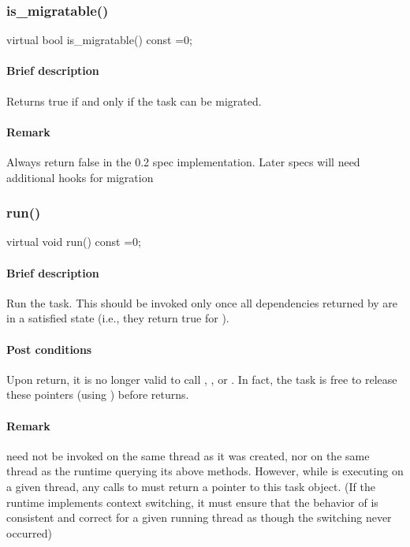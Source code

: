 \subsubsection{is\_migratable()}
\begin{CppCode}
    virtual bool
    is_migratable() const =0;
\end{CppCode}

\paragraph{Brief description} Returns true if and only if the task can be migrated.
     
\paragraph{Remark} Always return false in the 0.2 spec implementation.  Later specs will need
       additional hooks for migration



\subsubsection{run()}
\begin{CppCode}
    virtual void
    run() const =0;
\end{CppCode}

\paragraph{Brief description} Run the task.
       This should be invoked only once all dependencies returned by 
       are in a satisfied state (i.e., they return true for ).
     
\paragraph{Post conditions} Upon return, it is no longer valid to call , ,
       or .  In fact, the task is free to release these pointers (using
       ) before  returns.
     
\paragraph{Remark}  need not be invoked on the same thread as it was created, nor on the
       same thread as the runtime querying its above methods.  However, while  is executing
       on a given thread, any calls to  must return a pointer to
       this task object.  (If the runtime implements context switching, it must ensure that
       the behavior of  is consistent and correct for a given
       running thread as though the switching never occurred)


